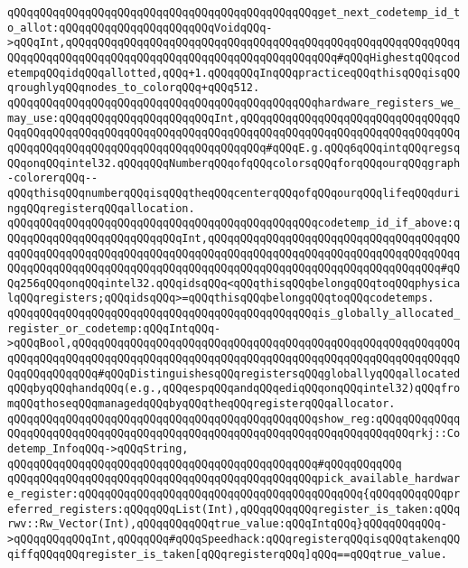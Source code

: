 \newline
\verb|qQQqqQQqqQQqqQQqqQQqqQQqqQQqqQQqqQQqqQQqqQQqqQQqget_next_codetemp_id_to_allot:qQQqqQQqqQQqqQQqqQQqqQQqVoidqQQq->qQQqInt,qQQqqQQqqQQqqQQqqQQqqQQqqQQqqQQqqQQqqQQqqQQqqQQqqQQqqQQqqQQqqQQqqQQqqQQqqQQqqQQqqQQqqQQqqQQqqQQqqQQqqQQqqQQqqQQq#qQQqHighestqQQqcodetempqQQqidqQQqallotted,qQQq+1.qQQqqQQqInqQQqpracticeqQQqthisqQQqisqQQqroughlyqQQqnodes_to_colorqQQq+qQQq512.|\newline
\newline
\verb|qQQqqQQqqQQqqQQqqQQqqQQqqQQqqQQqqQQqqQQqqQQqqQQqhardware_registers_we_may_use:qQQqqQQqqQQqqQQqqQQqqQQqInt,qQQqqQQqqQQqqQQqqQQqqQQqqQQqqQQqqQQqqQQqqQQqqQQqqQQqqQQqqQQqqQQqqQQqqQQqqQQqqQQqqQQqqQQqqQQqqQQqqQQqqQQqqQQqqQQqqQQqqQQqqQQqqQQqqQQqqQQqqQQqqQQq#qQQqE.g.qQQq6qQQqintqQQqregsqQQqonqQQqintel32.qQQqqQQqNumberqQQqofqQQqcolorsqQQqforqQQqourqQQqgraph-colorerqQQq--qQQqthisqQQqnumberqQQqisqQQqtheqQQqcenterqQQqofqQQqourqQQqlifeqQQqduringqQQqregisterqQQqallocation.|\newline
\newline
\verb|qQQqqQQqqQQqqQQqqQQqqQQqqQQqqQQqqQQqqQQqqQQqqQQqcodetemp_id_if_above:qQQqqQQqqQQqqQQqqQQqqQQqqQQqInt,qQQqqQQqqQQqqQQqqQQqqQQqqQQqqQQqqQQqqQQqqQQqqQQqqQQqqQQqqQQqqQQqqQQqqQQqqQQqqQQqqQQqqQQqqQQqqQQqqQQqqQQqqQQqqQQqqQQqqQQqqQQqqQQqqQQqqQQqqQQqqQQqqQQqqQQqqQQqqQQqqQQqqQQqqQQqqQQq#qQQq256qQQqonqQQqintel32.qQQqidsqQQq<qQQqthisqQQqbelongqQQqtoqQQqphysicalqQQqregisters;qQQqidsqQQq>=qQQqthisqQQqbelongqQQqtoqQQqcodetemps.|\newline
\verb|qQQqqQQqqQQqqQQqqQQqqQQqqQQqqQQqqQQqqQQqqQQqqQQqis_globally_allocated_register_or_codetemp:qQQqIntqQQq->qQQqBool,qQQqqQQqqQQqqQQqqQQqqQQqqQQqqQQqqQQqqQQqqQQqqQQqqQQqqQQqqQQqqQQqqQQqqQQqqQQqqQQqqQQqqQQqqQQqqQQqqQQqqQQqqQQqqQQqqQQqqQQqqQQqqQQqqQQqqQQqqQQqqQQq#qQQqDistinguishesqQQqregistersqQQqgloballyqQQqallocatedqQQqbyqQQqhandqQQq(e.g.,qQQqespqQQqandqQQqediqQQqonqQQqintel32)qQQqfromqQQqthoseqQQqmanagedqQQqbyqQQqtheqQQqregisterqQQqallocator.|\newline
\verb|qQQqqQQqqQQqqQQqqQQqqQQqqQQqqQQqqQQqqQQqqQQqqQQqshow_reg:qQQqqQQqqQQqqQQqqQQqqQQqqQQqqQQqqQQqqQQqqQQqqQQqqQQqqQQqqQQqqQQqqQQqqQQqqQQqrkj::Codetemp_InfoqQQq->qQQqString,|\newline
\verb|qQQqqQQqqQQqqQQqqQQqqQQqqQQqqQQqqQQqqQQqqQQqqQQq#qQQqqQQqqQQq|\newline
\verb|qQQqqQQqqQQqqQQqqQQqqQQqqQQqqQQqqQQqqQQqqQQqqQQqpick_available_hardware_register:qQQqqQQqqQQqqQQqqQQqqQQqqQQqqQQqqQQqqQQqqQQq{qQQqqQQqqQQqpreferred_registers:qQQqqQQqList(Int),qQQqqQQqqQQqregister_is_taken:qQQqrwv::Rw_Vector(Int),qQQqqQQqqQQqtrue_value:qQQqIntqQQq}qQQqqQQqqQQq->qQQqqQQqqQQqInt,qQQqqQQq#qQQqSpeedhack:qQQqregisterqQQqisqQQqtakenqQQqiffqQQqqQQqregister_is_taken[qQQqregisterqQQq]qQQq==qQQqtrue_value.|\newline
